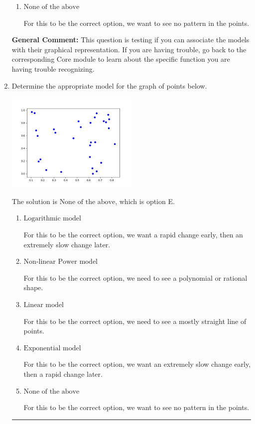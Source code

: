 \documentclass{extbook}[14pt]
\newcommand{\litem}[1]{\item #1

\rule{\textwidth}{0.4pt}}
\begin{document}
\begin{enumerate}
{\begin{enumerate}[label=\Alph*.]
For this to be the correct option, we need to see a polynomial or rational shape.
\item \( \text{None of the above} \)

For this to be the correct option, we want to see no pattern in the points.
\end{enumerate}

\textbf{General Comment:} This question is testing if you can associate the models with their graphical representation. If you are having trouble, go back to the corresponding Core module to learn about the specific function you are having trouble recognizing.
}
\litem{
Determine the appropriate model for the graph of points below.

\begin{center}
    \includegraphics[width=0.5\textwidth]{../Figures/identifyModelGraph12C.png}
\end{center}


The solution is \( \text{None of the above} \), which is option E.\begin{enumerate}[label=\Alph*.]
\item \( \text{Logarithmic model} \)

For this to be the correct option, we want a rapid change early, then an extremely slow change later.
\item \( \text{Non-linear Power model} \)

For this to be the correct option, we need to see a polynomial or rational shape.
\item \( \text{Linear model} \)

For this to be the correct option, we need to see a mostly straight line of points.
\item \( \text{Exponential model} \)

For this to be the correct option, we want an extremely slow change early, then a rapid change later.
\item \( \text{None of the above} \)

For this to be the correct option, we want to see no pattern in the points.
\end{enumerate}

}
\end{enumerate}
\end{document}
